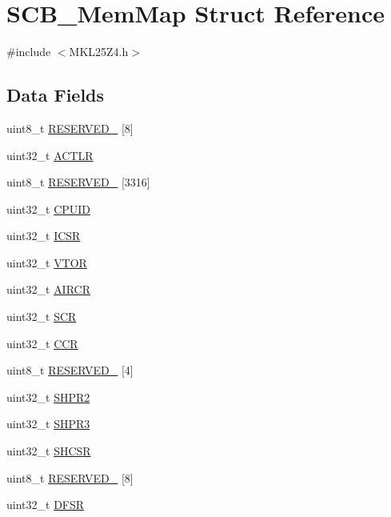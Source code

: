 \hypertarget{struct_s_c_b___mem_map}{}\section{S\+C\+B\+\_\+\+Mem\+Map Struct Reference}
\label{struct_s_c_b___mem_map}


{\ttfamily \#include $<$M\+K\+L25\+Z4.\+h$>$}

\subsection*{Data Fields}
\begin{DoxyCompactItemize}
\item 
uint8\+\_\+t \hyperlink{struct_s_c_b___mem_map_ad1b50f88903f5b63f2b92b7195511d00}{R\+E\+S\+E\+R\+V\+E\+D\+\_} \mbox{[}8\mbox{]}
\item 
uint32\+\_\+t \hyperlink{struct_s_c_b___mem_map_a474a33074611146734690e48ed41282e}{A\+C\+T\+LR}
\item 
uint8\+\_\+t \hyperlink{struct_s_c_b___mem_map_ab112bcf2a89a8f23d7c0a9f7c2ba687b}{R\+E\+S\+E\+R\+V\+E\+D\+\_} \mbox{[}3316\mbox{]}
\item 
uint32\+\_\+t \hyperlink{struct_s_c_b___mem_map_ad020795dcc3605b4c828af83df8b8836}{C\+P\+U\+ID}
\item 
uint32\+\_\+t \hyperlink{struct_s_c_b___mem_map_aafbaa0d0a4b79969877c9b84be8aaf7a}{I\+C\+SR}
\item 
uint32\+\_\+t \hyperlink{struct_s_c_b___mem_map_aa327db1d9948595498fba43acc8d336b}{V\+T\+OR}
\item 
uint32\+\_\+t \hyperlink{struct_s_c_b___mem_map_a3f874ca1c6e17ae4beadac22e8ec17ec}{A\+I\+R\+CR}
\item 
uint32\+\_\+t \hyperlink{struct_s_c_b___mem_map_ac8d0a0d974bde944d42429065dd2f44a}{S\+CR}
\item 
uint32\+\_\+t \hyperlink{struct_s_c_b___mem_map_aa6e957027d8c505047cd58101bb784aa}{C\+CR}
\item 
uint8\+\_\+t \hyperlink{struct_s_c_b___mem_map_a5aec30bee30f8ce5b1a151821cf79146}{R\+E\+S\+E\+R\+V\+E\+D\+\_} \mbox{[}4\mbox{]}
\item 
uint32\+\_\+t \hyperlink{struct_s_c_b___mem_map_a1636322022eb10e4acedf40018708b68}{S\+H\+P\+R2}
\item 
uint32\+\_\+t \hyperlink{struct_s_c_b___mem_map_a8ac3a3b8dd23fb279640b98a95fb796a}{S\+H\+P\+R3}
\item 
uint32\+\_\+t \hyperlink{struct_s_c_b___mem_map_ae2b73d4b9744b878527466ec57dbfdb7}{S\+H\+C\+SR}
\item 
uint8\+\_\+t \hyperlink{struct_s_c_b___mem_map_ada5d25c6c4f20fabcc3bb03db9bee4dd}{R\+E\+S\+E\+R\+V\+E\+D\+\_} \mbox{[}8\mbox{]}
\item 
uint32\+\_\+t \hyperlink{struct_s_c_b___mem_map_af178d6003a18eb7452c51edcec14ec5d}{D\+F\+SR}
\end{DoxyCompactItemize}


